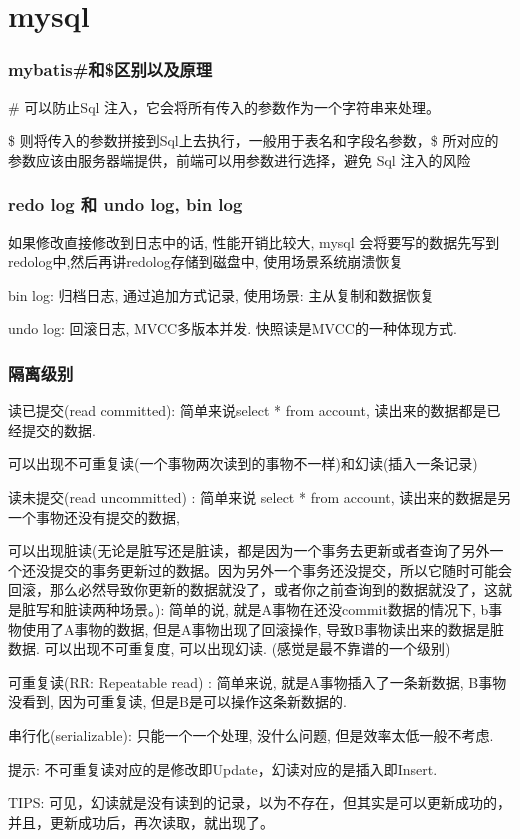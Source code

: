 \documentclass[UTF8]{ctexart}
\begin{document}
\section{mysql}
\subsubsection{mybatis\#和\$区别以及原理} 
\#{ }可以防止Sql 注入，它会将所有传入的参数作为一个字符串来处理。

\$ {} 则将传入的参数拼接到Sql上去执行，一般用于表名和字段名参数，\$ 所对应的参数应该由服务器端提供，前端可以用参数进行选择，避免 Sql 注入的风险
\subsubsection{redo log 和 undo log, bin log }
如果修改直接修改到日志中的话, 性能开销比较大, mysql 会将要写的数据先写到redolog中,然后再讲redolog存储到磁盘中, 使用场景系统崩溃恢复 \par
bin log: 归档日志, 通过追加方式记录, 使用场景: 主从复制和数据恢复 \par
undo log: 回滚日志, MVCC多版本并发. 快照读是MVCC的一种体现方式.
\subsubsection{隔离级别}
\par
读已提交(read committed): 简单来说select * from account, 读出来的数据都是已经提交的数据.
\par 可以出现不可重复读(一个事物两次读到的事物不一样)和幻读(插入一条记录)
\par 
读未提交(read uncommitted) : 简单来说 select * from account, 读出来的数据是另一个事物还没有提交的数据, 
\par 可以出现脏读(无论是脏写还是脏读，都是因为一个事务去更新或者查询了另外一个还没提交的事务更新过的数据。因为另外一个事务还没提交，所以它随时可能会回滚，那么必然导致你更新的数据就没了，或者你之前查询到的数据就没了，这就是脏写和脏读两种场景。): 简单的说, 就是A事物在还没commit数据的情况下, b事物使用了A事物的数据, 但是A事物出现了回滚操作, 导致B事物读出来的数据是脏数据. 可以出现不可重复度, 可以出现幻读. (感觉是最不靠谱的一个级别)
\par 
可重复读(RR: Repeatable read) : 简单来说, 就是A事物插入了一条新数据, B事物没看到, 因为可重复读, 但是B是可以操作这条新数据的. 
\par 
串行化(serializable): 只能一个一个处理, 没什么问题, 但是效率太低一般不考虑.
\par 提示: 不可重复读对应的是修改即Update，幻读对应的是插入即Insert.
\par TIPS:
可见，幻读就是没有读到的记录，以为不存在，但其实是可以更新成功的，并且，更新成功后，再次读取，就出现了。
\end{document}
